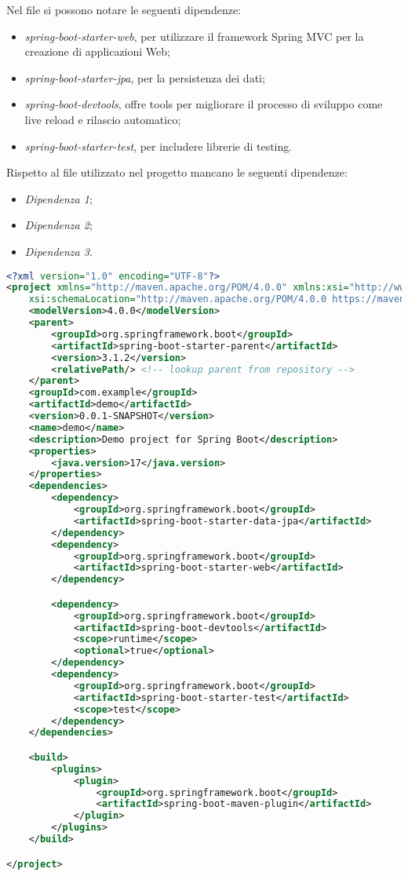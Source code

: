 \noindent Nel file si possono notare le seguenti dipendenze:
\begin{itemize}
\item \textit{spring-boot-starter-web}, per utilizzare il framework Spring MVC per la creazione di applicazioni Web;
\item \textit{spring-boot-starter-jpa}, per la persistenza dei dati;
\item \textit{spring-boot-devtools}, offre tools per migliorare il processo di sviluppo come live reload e rilascio automatico;
\item \textit{spring-boot-starter-test}, per includere librerie di testing.
\end{itemize}
Rispetto al file utilizzato nel progetto mancano le seguenti dipendenze:
\begin{itemize}
\item \textit{Dipendenza 1};
\item \textit{Dipendenza 2};
\item \textit{Dipendenza 3}.
\end{itemize}

\begin{lstlisting}[language=XML,caption = pom.xml con dipendenze selezionate]
<?xml version="1.0" encoding="UTF-8"?>
<project xmlns="http://maven.apache.org/POM/4.0.0" xmlns:xsi="http://www.w3.org/2001/XMLSchema-instance"
	xsi:schemaLocation="http://maven.apache.org/POM/4.0.0 https://maven.apache.org/xsd/maven-4.0.0.xsd">
	<modelVersion>4.0.0</modelVersion>
	<parent>
		<groupId>org.springframework.boot</groupId>
		<artifactId>spring-boot-starter-parent</artifactId>
		<version>3.1.2</version>
		<relativePath/> <!-- lookup parent from repository -->
	</parent>
	<groupId>com.example</groupId>
	<artifactId>demo</artifactId>
	<version>0.0.1-SNAPSHOT</version>
	<name>demo</name>
	<description>Demo project for Spring Boot</description>
	<properties>
		<java.version>17</java.version>
	</properties>
	<dependencies>
		<dependency>
			<groupId>org.springframework.boot</groupId>
			<artifactId>spring-boot-starter-data-jpa</artifactId>
		</dependency>
		<dependency>
			<groupId>org.springframework.boot</groupId>
			<artifactId>spring-boot-starter-web</artifactId>
		</dependency>

		<dependency>
			<groupId>org.springframework.boot</groupId>
			<artifactId>spring-boot-devtools</artifactId>
			<scope>runtime</scope>
			<optional>true</optional>
		</dependency>
		<dependency>
			<groupId>org.springframework.boot</groupId>
			<artifactId>spring-boot-starter-test</artifactId>
			<scope>test</scope>
		</dependency>
	</dependencies>

	<build>
		<plugins>
			<plugin>
				<groupId>org.springframework.boot</groupId>
				<artifactId>spring-boot-maven-plugin</artifactId>
			</plugin>
		</plugins>
	</build>

</project>
\end{lstlisting}

